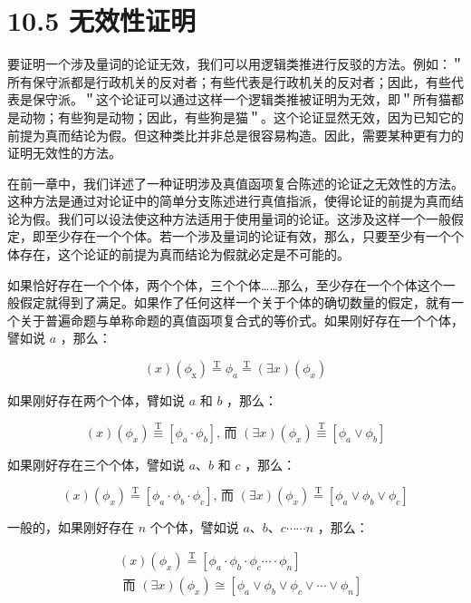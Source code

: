 \section*{10.5 无效性证明}
要证明一个涉及量词的论证无效，我们可以用逻辑类推进行反驳的方法。例如：＂所有保守派都是行政机关的反对者；有些代表是行政机关的反对者；因此，有些代表是保守派。＂这个论证可以通过这样一个逻辑类推被证明为无效，即＂所有猫都是动物；有些狗是动物；因此，有些狗是猫＂。这个论证显然无效，因为已知它的前提为真而结论为假。但这种类比并非总是很容易构造。因此，需要某种更有力的证明无效性的方法。

在前一章中，我们详述了一种证明涉及真值函项复合陈述的论证之无效性的方法。这种方法是通过对论证中的简单分支陈述进行真值指派，使得论证的前提为真而结论为假。我们可以设法使这种方法适用于使用量词的论证。这涉及这样一个一般假定，即至少存在一个个体。若一个涉及量词的论证有效，那么，只要至少有一个个体存在，这个论证的前提为真而结论为假就必定是不可能的。

如果恰好存在一个个体，两个个体，三个个体……那么，至少存在一个个体这个一般假定就得到了满足。如果作了任何这样一个关于个体的确切数量的假定，就有一个关于普遍命题与单称命题的真值函项复合式的等价式。如果刚好存在一个个体，譬如说 $a$ ，那么：

$$
(x)\left(\phi_{\mathrm{x}}\right) \stackrel{\mathrm{T}}{=} \phi_{a} \stackrel{\mathrm{T}}{=}(\exists x)\left(\phi_{x}\right)
$$

如果刚好存在两个个体，臂如说 $a$ 和 $b$ ，那么：

$$
(x)\left(\phi_{x}\right) \stackrel{\mathrm{T}}{\equiv}\left[\phi_{a} \cdot \phi_{b}\right] \text {, 而 }(\exists x)\left(\phi_{x}\right) \stackrel{\mathrm{T}}{\equiv}\left[\phi_{a} \vee \phi_{b}\right]
$$

如果刚好存在三个个体，譬如说 $a 、 b$ 和 $c$ ，那么：

$$
(x)\left(\phi_{x}\right) \stackrel{\mathrm{T}}{=}\left[\phi_{a} \cdot \phi_{b} \cdot \phi_{c}\right] \text {, 而 }(\exists x)\left(\phi_{x}\right) \stackrel{\mathrm{T}}{=}\left[\phi_{a} \vee \phi_{b} \vee \phi_{c}\right]
$$

一般的，如果刚好存在 $n$ 个个体，譬如说 $a 、 b 、 c \cdots \cdots n$ ，那么：

$$
\begin{aligned}
& (x)\left(\phi_{x}\right) \stackrel{\mathrm{T}}{=}\left[\phi_{a} \cdot \phi_{b} \cdot \phi_{c} \cdots \cdot \phi_{n}\right] \\
& \text { 而 }(\exists x)\left(\phi_{x}\right) \cong\left[\phi_{a} \vee \phi_{b} \vee \phi_{c} \vee \cdots \vee \phi_{n}\right]
\end{aligned}
$$

